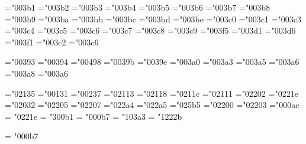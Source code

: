 \mathchardef\alpha="003b1
\mathchardef\beta="003b2
\mathchardef\gamma="003b3
\mathchardef\delta="003b4
\mathchardef\epsilon="003b5
\mathchardef\zeta="003b6
\mathchardef\eta="003b7
\mathchardef\theta="003b8
\mathchardef\iota="003b9
\mathchardef\kappa="003ba
\mathchardef\lambda="003bb
\mathchardef\mu="003bc
\mathchardef\nu="003bd
\mathchardef\xi="003be
\mathchardef\pi="003c0
\mathchardef\rho="003c1
\mathchardef\sigma="003c3
\mathchardef\tau="003c4
\mathchardef\upsilon="003c5
\mathchardef\phi="003c6
\mathchardef\chi="003c7
\mathchardef\psi="003c8
\mathchardef\omega="003c9
\mathchardef\varepsilon="003f5
\mathchardef\vartheta="003d1
\mathchardef\varpi="003d6
\mathchardef\varrho="003f1
\mathchardef\varsigma="003c2
\mathchardef\varphi="003c6

\mathchardef\Gamma="00393
\mathchardef\Delta="00394
\mathchardef\Theta="00498
\mathchardef\Lambda="0039b
\mathchardef\Xi="0039e
\mathchardef\Pi="003a0
\mathchardef\Sigma="003a3
\mathchardef\Upsilon="003a5
\mathchardef\Phi="003a6
\mathchardef\Psi="003a8
\mathchardef\Omega="003a6

\mathchardef\aleph="02135
\mathchardef\imath="00131
\mathchardef\jmath="00237
\mathchardef\ell="02113
\mathchardef\wp="02118
\mathchardef\Re="0211c
\mathchardef\Im="02111
\mathchardef\partial="02202
\mathchardef\infty="0221e
\mathchardef\prime="02032
\mathchardef\emptyset="02205
\mathchardef\nabla="02207
\mathchardef\top="022a4
\mathchardef\bot="022a5
\mathchardef\triangle="025b5
\mathchardef\forall="02200
\mathchardef\exists="02203
\mathchardef\neg="000ac \let\lnot=\neg
\mathchardef\infty = "0221e
\mathchardef\plusminus = "300b1
\mathchardef\cdotp = "000b7
\mathchardef\sum   = "103a3
\mathchardef\intop = "1222b

\def\int{\intop\nolimits}
\def\sqrt{\radical"2221a}
\mathchardef\cdotp = "000b7
\def\cdots{%
  \mathinner{\cdotp\cdotp\cdotp}}
